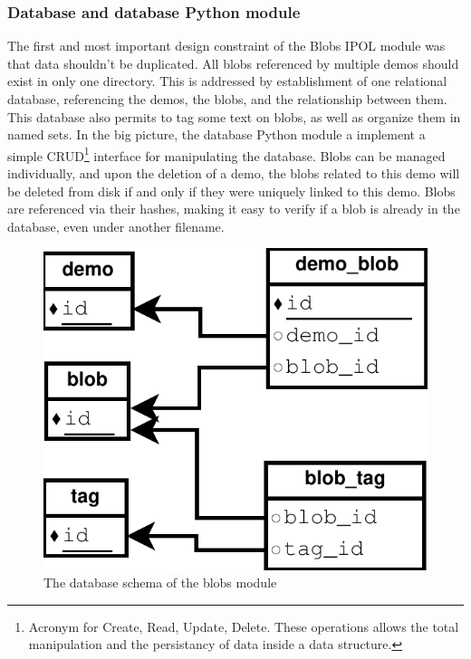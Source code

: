 \subsubsection{Database and database Python module}
The first and most important design constraint of the Blobs IPOL module was that data shouldn't be duplicated. All blobs referenced by multiple demos should exist in only one directory. This is addressed by establishment of one relational database, referencing the demos, the blobs, and the relationship between them. This database also permits to tag some text on blobs, as well as organize them in named sets. In the big picture, the database Python module a implement a simple CRUD\footnote{Acronym for Create, Read, Update, Delete. These operations allows the total manipulation and the persistancy of data inside a data structure.} interface for manipulating the database. Blobs can be managed individually, and upon the deletion of a demo, the blobs related to this demo will be deleted from disk if and only if they were uniquely linked to this demo. Blobs are referenced via their hashes, making it easy to verify if a blob is already in the database, even under another filename. \\

\begin{figure}[h]
\centering
\includegraphics[scale=0.75]{blobs/images/blobs_database.pdf}
\caption{The database schema of the blobs module} 
\label{fig:blobs_database}
\end{figure}


